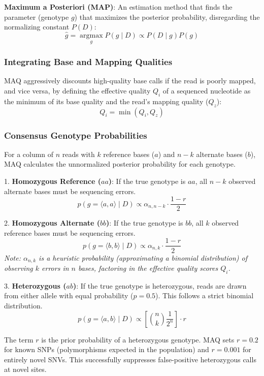 \documentclass[11pt,a4paper]{article}
\newenvironment{important}{
    \vspace{1em}
    \begin{tcolorbox}[colback=blue!5!white, colframe=blue!75!black, boxrule=1pt, arc=4pt, left=10pt, right=10pt, top=10pt, bottom=10pt]
}{
    \end{tcolorbox}
    \vspace{1em}
}
\begin{document}
\begin{important}
  \textbf{Maximum a Posteriori (MAP)}: An estimation method that finds the parameter (genotype \(g\)) that maximizes the posterior probability, disregarding the normalizing constant \(P(D)\):
  \[ \hat{g} = \underset{g}{\operatorname{argmax}} P(g \mid D) \propto P(D \mid g) P(g) \]
\end{important}

\subsubsection{Integrating Base and Mapping Qualities}
MAQ aggressively discounts high-quality base calls if the read is poorly mapped, and vice versa, by defining the effective quality \( Q_i \) of a sequenced nucleotide as the minimum of its base quality and the read's mapping quality (\(Q_z\)):
\[ Q_i = \min(Q_i, Q_z) \]

\subsubsection{Consensus Genotype Probabilities}
For a column of \( n \) reads with \( k \) reference bases (\(a\)) and \( n-k \) alternate bases (\(b\)), MAQ calculates the unnormalized posterior probability for each genotype.

1. \textbf{Homozygous Reference (\(aa\))}:
If the true genotype is \(aa\), all \(n-k\) observed alternate bases must be sequencing errors.
\[ p(g = \langle a,a \rangle \mid D) \propto \alpha_{n, n-k} \cdot \frac{1-r}{2} \]

2. \textbf{Homozygous Alternate (\(bb\))}:
If the true genotype is \(bb\), all \(k\) observed reference bases must be sequencing errors.
\[ p(g = \langle b,b \rangle \mid D) \propto \alpha_{n, k} \cdot \frac{1-r}{2} \]
\textit{Note: \(\alpha_{n,k}\) is a heuristic probability (approximating a binomial distribution) of observing \(k\) errors in \(n\) bases, factoring in the effective quality scores \(Q_i\).}

3. \textbf{Heterozygous (\(ab\))}:
If the true genotype is heterozygous, reads are drawn from either allele with equal probability (\(p=0.5\)). This follows a strict binomial distribution.
\[ p(g = \langle a,b \rangle \mid D) \propto \left[ \binom{n}{k} \frac{1}{2^n} \right] \cdot r \]

The term \(r\) is the prior probability of a heterozygous genotype. MAQ sets \(r=0.2\) for known SNPs (polymorphisms expected in the population) and \(r=0.001\) for entirely novel SNVs. This successfully suppresses false-positive heterozygous calls at novel sites.
\end{document}
